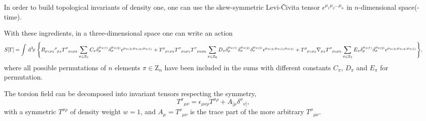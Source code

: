 \documentclass[twocolumn,
  showpacs,showkeys,prd,superscriptaddress]{revtex4-1}
\begin{document}
In order to build topological invariants of density one, one can use the skew-symmetric Levi-\v{C}ivita tensor $\epsilon^{\mu_1\mu_2\dots\mu_n}$ in $n$-dimensional space(-time).

\begin{widetext}
  With these ingredients, in a three-dimensional space one can write an action 
  \begin{dmath}[compact, spread=2pt]
    \label{accion3d}
       S[\Gamma] =
      \int \dn{3}{x}  \Bigg\{R_{\mu_1\mu_2}{}^\rho{}_{\mu_3} T^\sigma{}_{\mu_4\mu_5}\sum_{\pi \in  \mathrm{Z}_5}C_\pi\delta_\rho^{\mu_{\pi(1)}} \delta_\sigma^{\mu_{\pi(2)}}\epsilon^{\mu_{\pi(3)}\mu_{\pi(4)}\mu_{\pi(5)}} 
       + T^\rho{}_{\mu_1\mu_2} T^\sigma{}_{\mu_3\mu_4}T^\tau{}_{\mu_5\mu_6} \sum_{\pi \in \mathrm{Z}_6}D_\pi      \delta_\rho^{\mu_{\pi(1)}} \delta_\sigma^{\mu_{\pi(2)}}\delta_\tau^{\mu_{\pi(3)}}\epsilon^{\mu_{\pi(4)}\mu_{\pi(5)}\mu_{\pi(6)}} 
       +T^\rho{}_{\mu_1\mu_2}\nabla_{\mu_3} 
       T^\sigma{}_{\mu_4\mu_5}\sum_{\pi \in \mathrm Z_5}E_\pi\delta_\rho^{\mu_{\pi(1)}} \delta_\sigma^{\mu_{\pi(2)}}\epsilon^{\mu_{\pi(3)}\mu_{\pi(4)}\mu_{\pi(5)}} \Bigg\}, 
  \end{dmath}
  where all possible permutations of $n$ elements $\pi\in\mathrm{Z}_n$ have been included in the sums with  different constants $C_\pi$, $D_\pi$ and $E_\pi$ for  permutation. 
\end{widetext}

The torsion field can be decomposed into invariant tensors respecting the symmetry,
\begin{equation}
  T^\sigma{}_{\mu\nu}=\epsilon_{\mu\nu\rho} T^{\sigma\rho}+A_{[\mu}\delta^\sigma{}_{\nu]},
\end{equation}
with a symmetric $T^{\sigma\rho}$ of density weight  $w =1$, and \mbox{$A_\mu=T^\nu{}_{\mu\nu}$} is the trace part of the more arbitrary $T^\sigma{}_{\mu\nu}$.
\end{document}
